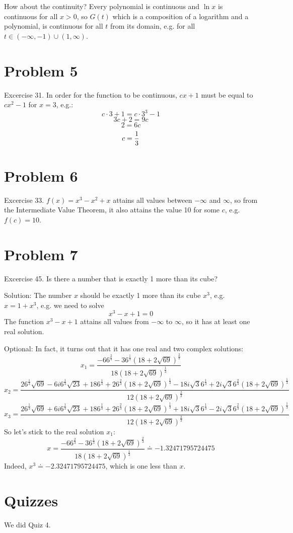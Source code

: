 \documentclass[10pt]{article}
\begin{document}
How about the continuity? Every polynomial is continuous and $\ln x$ is
continuous for all $x>0$, so $G(t)$ which is a composition of a logarithm and a
polynomial, is continuous for all $t$ from its domain, e.g. for all
$t\in (-\infty, -1) \cup (1, \infty)$.

\section{Problem 5}

Excercise 31. In order for the function to be continuous, $cx+1$ must be equal
to $cx^2-1$ for $x=3$, e.g.:
$$c\cdot3+1 = c\cdot 3^3-1$$
$$3c+2 = 9c$$
$$2 = 6c$$
$$c = {1\over3}$$

\section{Problem 6}

Excercise 33. $f(x) = x^3-x^2+x$ attains all values between $-\infty$ and
$\infty$, so from the Intermediate Value Theorem, it also attains the value 10
for some $c$, e.g. $f(c)=10$.

\section{Problem 7}

Excercise 45. Is there a number that is exactly 1 more than its cube?

Solution: The number $x$ should be exactly 1 more than its cube $x^3$, e.g.
$x=1+x^3$, e.g. we need to solve
$$x^3-x+1=0$$
The function $x^3-x+1$ attains all values from $-\infty$ to $\infty$, so it has
at least one real solution.

Optional: In fact, it turns out that
it has one real and two complex solutions:
$$x_1=\frac{- 6 6^{\frac{2}{3}} - 3 6^{\frac{1}{3}} \left(18 + 2
\sqrt{69}\right)^{\frac{2}{3}}}{18 \left(18 + 2
\sqrt{69}\right)^{\frac{1}{3}}}$$
$$x_2=\frac{2 6^{\frac{1}{3}} \sqrt{69} - 6
i 6^{\frac{1}{3}} \sqrt{23} + 18 6^{\frac{1}{3}} + 2
6^{\frac{2}{3}} \left(18 + 2 \sqrt{69}\right)^{\frac{1}{3}} - 18
i \sqrt{3} 6^{\frac{1}{3}} + 2 i \sqrt{3}
6^{\frac{2}{3}} \left(18 + 2 \sqrt{69}\right)^{\frac{1}{3}}}{12 \left(18 + 2
\sqrt{69}\right)^{\frac{2}{3}}}$$
$$x_3=\frac{2 6^{\frac{1}{3}} \sqrt{69} + 6
i 6^{\frac{1}{3}} \sqrt{23} + 18 6^{\frac{1}{3}} + 2
6^{\frac{2}{3}} \left(18 + 2 \sqrt{69}\right)^{\frac{1}{3}} + 18
i \sqrt{3} 6^{\frac{1}{3}} - 2 i \sqrt{3}
6^{\frac{2}{3}} \left(18 + 2 \sqrt{69}\right)^{\frac{1}{3}}}{12 \left(18 + 2
\sqrt{69}\right)^{\frac{2}{3}}}$$
So let's stick to the real solution $x_1$:
$$x=\frac{- 6 6^{\frac{2}{3}} - 3 6^{\frac{1}{3}} \left(18 + 2
\sqrt{69}\right)^{\frac{2}{3}}}{18 \left(18 + 2
\sqrt{69}\right)^{\frac{1}{3}}}\doteq-1.32471795724475$$
Indeed, $x^3\doteq-2.32471795724475$, which is one less than $x$.

\section{Quizzes}

We did Quiz 4.
\end{document}
